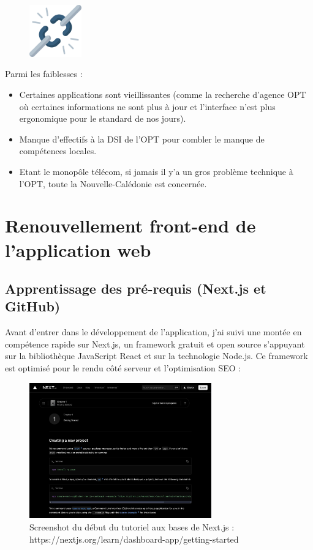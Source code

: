 \documentclass[12pt,a4paper]{report}
\begin{document}
\vspace{1cm}
\begin{figure}[h] %
    \centering
    \includegraphics[width=0.2\textwidth]{ressources_rapport/faiblesses.png}
\end{figure}
Parmi les faiblesses : 
\begin{itemize}
    \item Certaines applications sont vieillissantes (comme la recherche d'agence OPT où certaines informations ne sont plus à jour et l'interface n'est plus ergonomique pour le standard de nos jours).
    \item Manque d'effectifs à la DSI de l'OPT pour combler le manque de compétences locales.
    \item Etant le monopôle télécom, si jamais il y'a un gros problème technique à l'OPT, toute la Nouvelle-Calédonie est concernée.
\end{itemize}

\chapter{Renouvellement front-end de l'application web}
\section{Apprentissage des pré-requis (Next.js et GitHub)}
Avant d’entrer dans le développement de l'application, j’ai suivi une montée en compétence rapide sur Next.js, un framework gratuit et open source s'appuyant sur la bibliothèque JavaScript React et sur la technologie Node.js. Ce framework est optimisé pour le rendu côté serveur et l’optimisation SEO : 

\vspace{1cm}
\begin{figure}[h] %
    \centering
    \includegraphics[width=0.7\textwidth]{ressources_rapport/learn_next.JPG}
    \caption{Screenshot du début du tutoriel aux bases de Next.js : https://nextjs.org/learn/dashboard-app/getting-started}
    \label{fig:exemple}
\end{figure}
\end{document}
